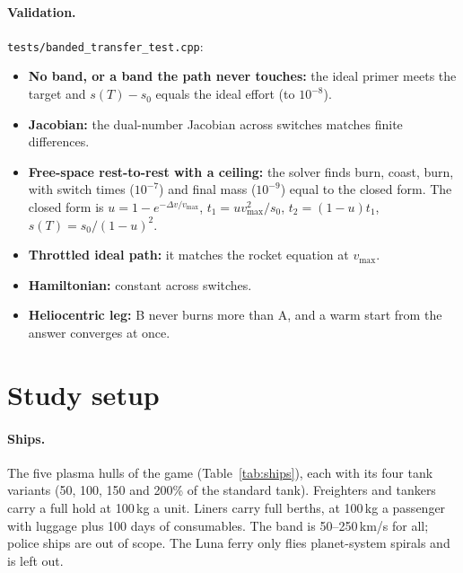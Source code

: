 \documentclass[10pt,a4paper]{article}
\begin{document}
\paragraph{Validation.} \texttt{tests/banded\_transfer\_test.cpp}:
\begin{itemize}
\item \textbf{No band, or a band the path never touches:} the ideal primer meets the target and
  $s(T) - s_0$ equals the ideal effort (to $10^{-8}$).
\item \textbf{Jacobian:} the dual-number Jacobian across switches matches finite differences.
\item \textbf{Free-space rest-to-rest with a ceiling:} the solver finds burn, coast, burn, with switch times
  ($10^{-7}$) and final mass ($10^{-9}$) equal to the closed form. The closed form is
  $u = 1 - e^{-\Delta v/v_{\max}}$, $t_1 = u v_{\max}^2/s_0$, $t_2 = (1-u)t_1$, $s(T) = s_0/(1-u)^2$.
\item \textbf{Throttled ideal path:} it matches the rocket equation at $v_{\max}$.
\item \textbf{Hamiltonian:} constant across switches.
\item \textbf{Heliocentric leg:} B never burns more than A, and a warm start from the answer converges at once.
\end{itemize}

\section{Study setup}

\paragraph{Ships.} The five plasma hulls of the game (Table~\ref{tab:ships}), each with its four tank variants
(50, 100, 150 and 200\% of the standard tank). Freighters and tankers carry a full hold at 100\,kg a unit. Liners
carry full berths, at 100\,kg a passenger with luggage plus 100 days of consumables. The band is 50--250\,km/s for
all; police ships are out of scope. The Luna ferry only flies planet-system spirals and is left out.

\begin{table}[h]\centering\small
\caption{The plasma hulls at their standard tanks, fully loaded. $a_{\min}$ and $a_{\max}$ are the thrust
accelerations at full power and 250 or 50\,km/s, at departure. The daily cost is the game's capital charge plus crew
and life support.}
\label{tab:ships}
\setlength\tabcolsep{4pt}\tabships
\end{table}
\end{document}
